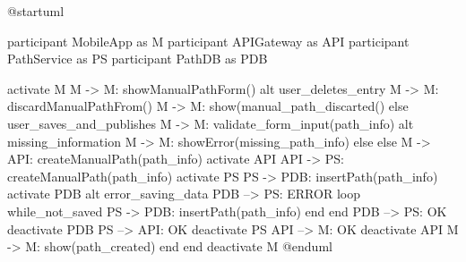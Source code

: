 @startuml

participant MobileApp as M
participant APIGateway as API 
participant PathService as PS
participant PathDB as PDB

activate M
M -> M: showManualPathForm()
alt user_deletes_entry
M -> M: discardManualPathFrom()
M -> M: show(manual_path_discarted()
else user_saves_and_publishes
M -> M: validate_form_input(path_info)
alt missing_information
M -> M: showError(missing_path_info)
else else 
M -> API: createManualPath(path_info)
activate API
API -> PS: createManualPath(path_info)
activate PS
PS -> PDB: insertPath(path_info)
activate PDB
alt error_saving_data
PDB --> PS: ERROR
loop while_not_saved
PS -> PDB: insertPath(path_info)
end
end
PDB --> PS: OK
deactivate PDB
PS --> API: OK
deactivate PS
API --> M: OK
deactivate API
M -> M: show(path_created)
end
end
deactivate M
@enduml